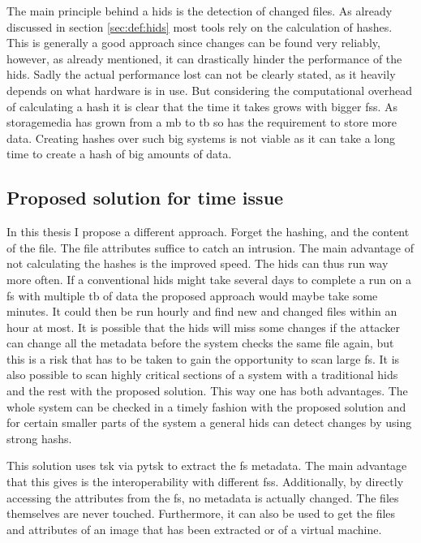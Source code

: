 The main principle behind a \gls{hids} is the detection of changed files. As already discussed in section \ref{sec:def:hids} most tools rely on the calculation of hashes. This is generally a good approach since changes can be found very reliably, however, as already mentioned, it can drastically hinder the performance of the \gls{hids}. Sadly the actual performance lost can not be clearly stated, as it heavily depends on what hardware is in use. But considering the computational overhead of calculating a \gls{hash} it is clear that the time it takes grows with bigger \glspl{fs}. As \gls{storagemedia} has grown from a \gls{mb} to \gls{tb} so has the requirement to store more data. Creating hashes over such big systems is not viable as it can take a long time to create a hash of big amounts of data. \cite{hash:slow, hash:veryslow, hash:speed}

\subsection{Proposed solution for time issue}

In this thesis I propose a different approach. Forget the hashing, and the content of the file. The file attributes suffice to catch an intrusion. The main advantage of not calculating the hashes is the improved speed. The \gls{hids} can thus run way more often. If a conventional \gls{hids} might take several days to complete a run on a \gls{fs} with multiple \gls{tb} of data the proposed approach would maybe take some minutes. It could then be run hourly and find new and changed files within an hour at most. It is possible that the \gls{hids} will miss some changes if the attacker can change all the \gls{metadata} before the system checks the same file again, but this is a risk that has to be taken to gain the opportunity to scan large \gls{fs}. It is also possible to scan highly critical sections of a system with a traditional \gls{hids} and the rest with the proposed solution. This way one has both advantages. The whole system can be checked in a timely fashion with the proposed solution and for certain smaller parts of the system a general \gls{hids} can detect changes by using strong \glspl{hash}.

This solution uses \gls{tsk} via \gls{pytsk} to extract the \gls{fs} \gls{metadata}. The main advantage that this gives is the interoperability with different \glspl{fs}. Additionally, by directly accessing the attributes from the \gls{fs}, no \gls{metadata} is actually changed. The files themselves are never touched. Furthermore, it can also be used to get the files and attributes of an image that has been extracted or of a virtual machine. 

